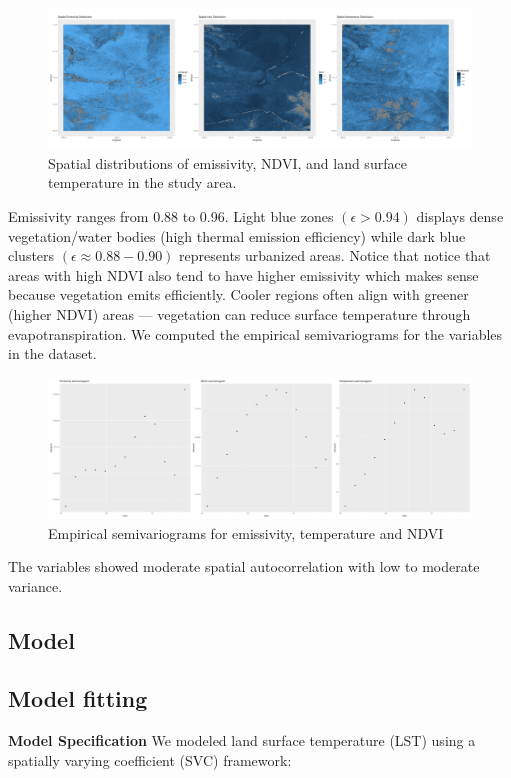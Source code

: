  \begin{figure}[h]
 \centering
 \includegraphics[width=\textwidth]{../../figures/spatial_horizontal_stack.png}
 \caption{
   Spatial distributions of emissivity, NDVI, and  land surface temperature in the study area. 
 }
 \label{fig:spatialpatterns}
 \end{figure}
 
 Emissivity ranges from 0.88 to 0.96. Light blue zones $(\epsilon > 0.94)$ displays dense vegetation/water bodies (high thermal emission efficiency)
 while dark blue clusters $(\epsilon \approx 0.88-0.90)$ represents urbanized areas. Notice that notice that areas with high NDVI also tend to have higher emissivity which makes sense because vegetation emits efficiently.
 Cooler regions often align with greener (higher NDVI) areas — vegetation can reduce surface temperature through evapotranspiration. \newline
 We computed the empirical semivariograms for the variables in the dataset. 
 \begin{figure}[h]
 \centering
 \includegraphics[width=\textwidth]{../../figures/semivariograms.png}
 \caption{Empirical semivariograms for emissivity, temperature and NDVI}
 \label{fig:semivariograms}
 \end{figure}
The variables showed moderate spatial autocorrelation with low to moderate variance.
\subsection{Model}

\subsection{Model fitting}
\textbf{Model Specification}\newline
We modeled land surface temperature (LST) using a spatially varying coefficient (SVC) framework:

